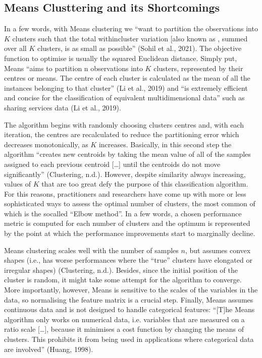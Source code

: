 \documentclass[letterpaper,10pt,english]{jupyterBook}
\begin{document}
\subsection{\sphinxhyphen{}Means Clusttering and its Shortcomings}
\label{\detokenize{04-stations_kmeans:k-means-clusttering-and-its-shortcomings}}
\sphinxAtStartPar
In a few words, with \sphinxhyphen{}Means clustering  we “want to partition the observations into \(K\) clusters such that the total within\sphinxhyphen{}cluster variation {[}also known as  \sphinxstyleemphasis{inertia}{]}, summed over all \(K\) clusters, is as small as possible” (Sohil et al., 2021). The objective function to optimise is usually the squared Euclidean distance. Simply put, \sphinxhyphen{}Means “aims to partition n observations into \(K\) clusters, represented by their centres or means. The centre of each cluster is calculated as the mean of all the instances belonging to that cluster” (Li et al., 2019) and “is extremely efficient and concise for the classification of equivalent multidimensional data” such as sharing services data (Li et al., 2019).

\sphinxAtStartPar
The algorithm begins with randomly choosing clusters centres and, with each iteration, the centres are re\sphinxhyphen{}calculated to reduce the partitioning error \sphinxhyphen{} which decreases monotonically, as \(K\) increases. Basically, in this second step the algorithm “creates new centroids by taking the mean value of all of the samples assigned to each previous centroid {[}…{]} until the centroids do not move significantly” (Clustering, n.d.). However, despite similarity always increasing, values of \(K\) that are too great defy the purpose of this classification algorithm. For this reasons, practitioners and researchers have come up with more or less sophisticated ways to assess the optimal number of clusters, the most common of which is the so\sphinxhyphen{}called “Elbow method”. In a few words, a chosen performance metric is computed for each number of clusters and the optimum is represented by the point at which the performance improvements start to marginally decline.

\sphinxAtStartPar
{}\sphinxhyphen{}Means clustering scales well with the number of samples \(n\), but assumes convex shapes (i.e., has worse performances where the “true” clusters have elongated or irregular shapes) (Clustering, n.d.). Besides, since the initial position of the cluster is random, it might take some attempt for the algorithm to converge. More importantly, however, \sphinxhyphen{}Means is sensitive to the scales of the variables in the data, so normalising the feature matrix is a crucial step. Finally, \sphinxhyphen{}Means assumes continuous data and is not designed to handle categorical features: “{[}T{]}he \sphinxhyphen{}Means algorithm only works on numerical data, i.e. variables that are measured on a ratio scale {[}…{]}, because it minimises a cost function by changing the means of clusters. This prohibits it from being used in applications where categorical data are involved” (Huang, 1998).
\end{document}
